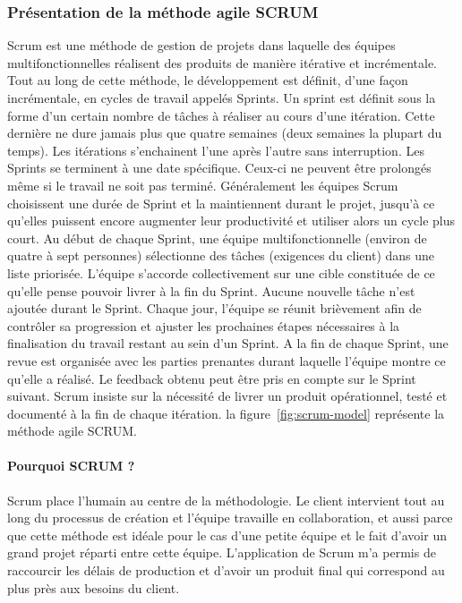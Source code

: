 \subsubsection{Présentation de la méthode agile SCRUM}
Scrum est une méthode de gestion de projets dans laquelle des équipes
multifonctionnelles réalisent des produits de manière itérative et incrémentale. Tout au
long de cette méthode, le développement est définit, d’une façon incrémentale, en cycles
de travail appelés Sprints. Un sprint est définit sous la forme d’un certain nombre de
tâches à réaliser au cours d’une itération. Cette dernière ne dure jamais plus que quatre
semaines (deux semaines la plupart du temps). Les itérations s’enchainent l’une après
l’autre sans interruption. Les Sprints se terminent à une date spécifique. Ceux-ci ne
peuvent être prolongés même si le travail ne soit pas terminé. Généralement les équipes
Scrum choisissent une durée de Sprint et la maintiennent durant le projet, jusqu’à ce
qu’elles puissent encore augmenter leur productivité et utiliser alors un cycle plus court.
Au début de chaque Sprint, une équipe multifonctionnelle (environ de quatre à sept
personnes) sélectionne des tâches (exigences du client) dans une liste priorisée.
L’équipe s’accorde collectivement sur une cible constituée de ce qu’elle pense pouvoir
livrer à la fin du Sprint. Aucune nouvelle tâche n’est ajoutée durant le Sprint. Chaque
jour, l’équipe se réunit brièvement afin de contrôler sa progression et ajuster les
prochaines étapes nécessaires à la finalisation du travail restant au sein d’un Sprint. A la
fin de chaque Sprint, une revue est organisée avec les parties prenantes durant laquelle
l’équipe montre ce qu’elle a réalisé. Le feedback obtenu peut être pris en compte sur le
Sprint suivant. Scrum insiste sur la nécessité de livrer un produit opérationnel,
testé et documenté à la fin de chaque itération.
la figure~\ref{fig:scrum-model} représente la méthode agile SCRUM. 


\paragraph{Pourquoi SCRUM ?}
Scrum place l’humain au centre de la méthodologie. Le client intervient tout au long
du processus de création et l’équipe travaille en collaboration, et aussi parce que cette
méthode est idéale pour le cas d’une petite équipe et le fait d’avoir un grand projet réparti
entre cette équipe.
L’application de Scrum m’a permis de raccourcir les délais de production et d’avoir
un produit final qui correspond au plus près aux besoins du client.

